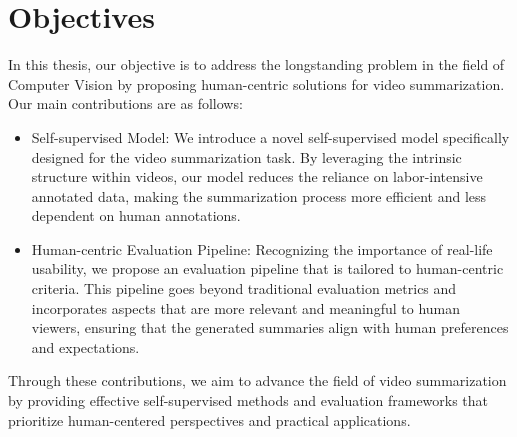 \section{Objectives}
\label{section:intro-objectives}

In this thesis, our objective is to address the longstanding problem in the field of Computer Vision by proposing human-centric solutions for video summarization. Our main contributions are as follows:



\begin{itemize}
  \item Self-supervised Model: We introduce a novel self-supervised model specifically designed for the video summarization task. By leveraging the intrinsic structure within videos, our model reduces the reliance on labor-intensive annotated data, making the summarization process more efficient and less dependent on human annotations.
  \item Human-centric Evaluation Pipeline: Recognizing the importance of real-life usability, we propose an evaluation pipeline that is tailored to human-centric criteria. This pipeline goes beyond traditional evaluation metrics and incorporates aspects that are more relevant and meaningful to human viewers, ensuring that the generated summaries align with human preferences and expectations.
\end{itemize}

Through these contributions, we aim to advance the field of video summarization by providing effective self-supervised methods and evaluation frameworks that prioritize human-centered perspectives and practical applications.